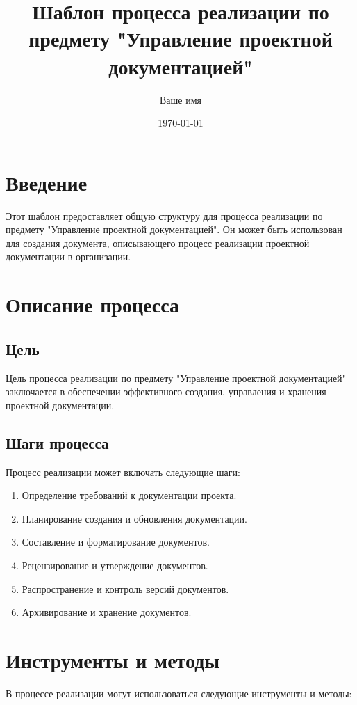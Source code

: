 \documentclass{article}
\begin{document}
\title{Шаблон процесса реализации по предмету "Управление проектной документацией"}
\author{Ваше имя}
\date{\today}
\maketitle

\tableofcontents
\newpage

\section{Введение}
Этот шаблон предоставляет общую структуру для процесса реализации по предмету "Управление проектной документацией". Он может быть использован для создания документа, описывающего процесс реализации проектной документации в организации.

\section{Описание процесса}

\subsection{Цель}
Цель процесса реализации по предмету "Управление проектной документацией" заключается в обеспечении эффективного создания, управления и хранения проектной документации.

\subsection{Шаги процесса}
Процесс реализации может включать следующие шаги:

\begin{enumerate}
    \item Определение требований к документации проекта.
    \item Планирование создания и обновления документации.
    \item Составление и форматирование документов.
    \item Рецензирование и утверждение документов.
    \item Распространение и контроль версий документов.
    \item Архивирование и хранение документов.
\end{enumerate}

\section{Инструменты и методы}
В процессе реализации могут использоваться следующие инструменты и методы:
\end{document}
